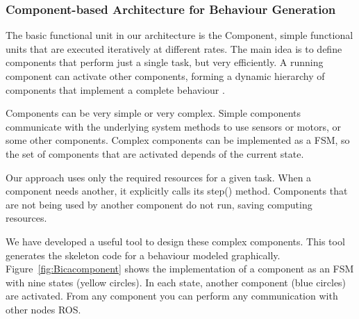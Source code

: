 \documentclass[citeauthoryear]{llncs}
\begin{document}
\subsubsection{Component-based Architecture for Behaviour Generation}

% 
% 
% 
% 
% 



The basic functional unit in our architecture is the Component, simple functional units
that are executed iteratively at different rates. The main idea is to define components that
perform just a single task, but very efficiently. A running component can activate other
components, forming a dynamic hierarchy of components that implement a complete
behaviour .

Components can be very simple or very complex. Simple components communicate with
the underlying system methods to use sensors or motors, or some other components.
Complex components can be implemented as a FSM, so the set of components that are
activated depends of the current state.


Our approach uses only the required resources for a given task. When a component needs
another, it explicitly calls its step() method. Components that are not being used by
another component do not run, saving computing resources. 

We have developed a useful tool to design these complex components. This tool generates
the skeleton code for a behaviour  modeled graphically. Figure~\ref{fig:Bicacomponent} shows the implementation
of a component as an FSM with nine states (yellow circles). In each state, another component
(blue circles) are activated. From any component you can perform any communication with
other nodes ROS.
\end{document}
